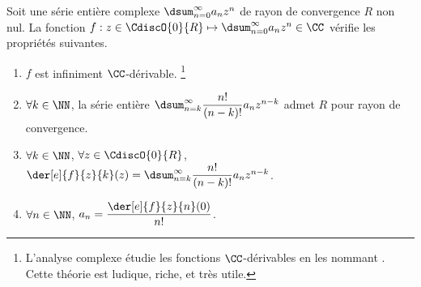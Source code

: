 

\begin{preli} \label{der-power-serie}
    Soit une série entière complexe $\dsum_{n=0}^{\infty} a_n z^n$ de rayon de convergence $R$ non nul.
    La fonction $f: z \in \CdiscO{0}{R} \mapsto \dsum_{n=0}^{\infty} a_n z^n \in \CC$ vérifie les propriétés suivantes.
    \begin{enumerate}
    	\item $f$ est infiniment $\CC$-dérivable.%
		\footnote{
			L'analyse complexe étudie les fonctions $\CC$-dérivables en les nommant .
			Cette théorie est ludique, riche, et très utile.
		}

    	\item $\forall k \in \NN$,
		la série entière $\dsum_{n = k}^{\infty} \dfrac{n!}{(n-k)!} a_n z^{n - k}$ admet $R$ pour rayon de convergence.

    	\item $\forall k \in \NN$, $\forall z \in \CdiscO{0}{R}$,
		$\der[e]{f}{z}{k}(z) = \dsum_{n = k}^{\infty} \dfrac{n!}{(n-k)!} a_n z^{n - k}$.

    	\item \label{a_n-value}
		$\forall n \in \NN$,  $a_n = \dfrac{\der[e]{f}{z}{n}(0)}{n!}$.
    \end{enumerate}
\end{preli}


